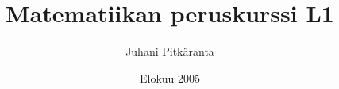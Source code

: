 \documentclass[12pt,a4paper, finnish]{report}
\author{Juhani Pitkäranta}
\title{Matematiikan peruskurssi L1}
\date{Elokuu 2005}
\begin{document}

\newcommand{\alku}{\setcounter{Exa}{0} \setcounter{equation}{0}}
\newcommand{\jatko}{\addtocounter{Exa}{-1}}
\newcommand{\seur}{\addtocounter{Exa}{1}}







\end{document}
